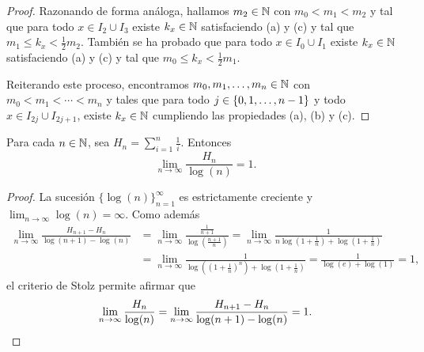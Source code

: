 \documentclass[a4paper, 12pt]{book}
\begin{document}
\begin{proof}
    Razonando de forma análoga, hallamos $m_2 \in \mathbb N$ con $m_0 < m_1 < m_2$ y tal que para todo $x \in I_{2} \cup I_3$ existe $k_x \in \mathbb N$ satisfaciendo (a) y (c) y tal que $m_1 \leq k_x < \frac{1}{2}m_2$. También se ha probado que para todo $x \in I_0 \cup I_1$ existe $k_x \in \mathbb N$ satisfaciendo (a) y (c) y tal que $m_0 \leq k_x < \frac{1}{2}m_1$.
    
    Reiterando este proceso, encontramos $m_0,m_1,\mathellipsis,m_n\in\mathbb N$ con $m_0 < m_1 < \cdots < m_n$ y tales que para todo $j \in \{0,1,\mathellipsis,n-1\}$ y todo $x \in I_{2j}\cup I_{2j+1}$, existe $k_x \in \mathbb N$ cumpliendo las propiedades (a), (b) y (c).
\end{proof}

\begin{lemma}\label{2.2.11}
    Para cada $n \in \mathbb N$, sea $H_n = \sum_{i=1}^n \frac{1}{i}$. Entonces
    \[\lim_{n \to \infty} \frac{H_n}{\log(n)} = 1.\]
\end{lemma}

\begin{proof}
    La sucesión $\{\log(n)\}_{n=1}^\infty$ es estrictamente creciente y $\lim_{n\to\infty} \log(n) = \infty$. Como además
    \begin{align*}
        \lim_{n\to\infty}\frac{H_{n+1}-H_n}{\log(n+1)-\log(n)} &= \lim_{n\to\infty} \frac{\frac{1}{n+1}}{\log(\frac{n+1}{n})} = \lim_{n\to\infty}\frac{1}{n\log(1+\frac{1}{n})+\log(1+\frac{1}{n})} 
        \\ &= \lim_{n\to\infty}\frac{1}{\log((1+\frac{1}{n})^n)+\log(1+\frac{1}{n})} = \frac{1}{\log(e)+\log(1)} = 1,
    \end{align*}
    el criterio de Stolz permite afirmar que
    \[\lim_{n\to\infty}\frac{H_n}{\log(n)} = \lim_{n\to\infty}\frac{H_{n+1}-H_n}{\log(n+1)-\log(n)} = 1.\qedhere\]
\end{proof}
\end{document}
